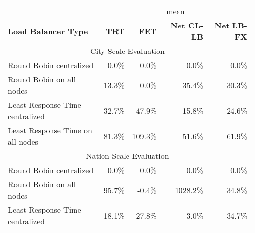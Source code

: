 \begin{table}[]
\begin{tabular}{lrrrr}
\hline
                                 & \multicolumn{4}{c}{mean}                                                                                                                              \\
\textbf{Load Balancer Type}      & \multicolumn{1}{r}{\textbf{TRT}} & \multicolumn{1}{r}{\textbf{FET}} & \multicolumn{1}{r}{\textbf{Net CL-LB}} & \multicolumn{1}{r}{\textbf{Net LB-FX}} \\ \hline
\multicolumn{5}{c}{City Scale Evaluation}                                                                                                                                                \\ \hline
Round Robin centralized          & 0.0\%                            & 0.0\%                            & 0.0\%                                  & 0.0\%                                  \\
Round Robin on all nodes         & 13.3\%                           & 0.0\%                            & 35.4\%                                 & 30.3\%                                 \\
Least Response Time centralized  & 32.7\%                           & 47.9\%                           & 15.8\%                                 & 24.6\%                                 \\
Least Response Time on all nodes & 81.3\%                           & 109.3\%                          & 51.6\%                                 & 61.9\%                                 \\ \hline
\multicolumn{5}{c}{Nation Scale Evaluation}                                                                                                                                              \\ \hline
Round Robin centralized          & 0.0\%                            & 0.0\%                            & 0.0\%                                  & 0.0\%                                  \\
Round Robin on all nodes         & 95.7\%                           & -0.4\%                           & 1028.2\%                               & 34.8\%                                 \\
Least Response Time centralized  & 18.1\%                           & 27.8\%                           & 3.0\%                                  & 34.7\%                                 \\

\end{tabular}
\end{table}
